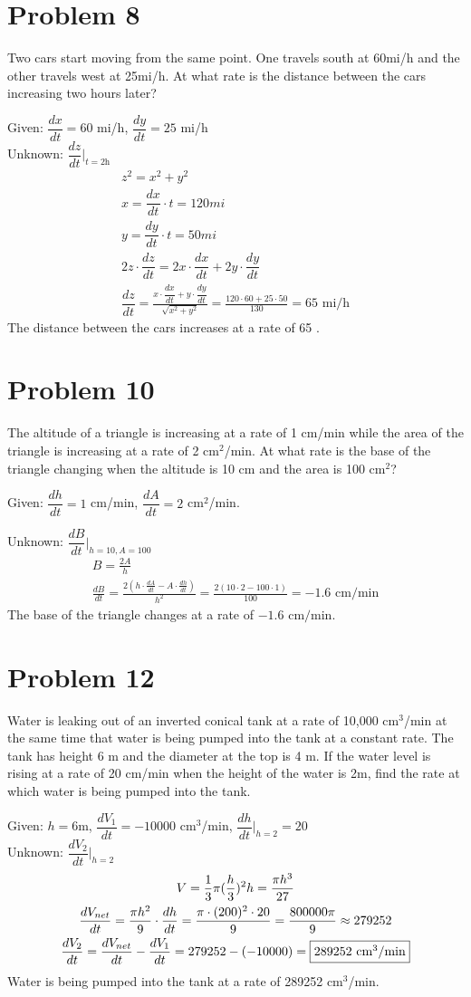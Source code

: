 \documentclass[12pt]{article}
\newcommand{\dydt}{\dfrac{dy}{dt}}
\newcommand{\dxdt}{\dfrac{dx}{dt}}
\newcommand{\vem}{\vspace{0.5em}}
\newcommand{\problem}[1]{\section{Problem #1}}
\begin{document}
\problem{8}
Two cars start moving from the same point. One travels south at 60mi/h and the other travels west at 25mi/h. At what rate is the distance between the cars increasing two hours later? \vem

Given: $\dxdt=60$ mi/h, $\dydt=25$ mi/h\\

Unknown: $\dfrac{dz}{dt} \Big|_{t=2 \text{h}}$
\begin{gather*}
    z^2=x^2+y^2\\
    x=\dxdt\cdot t=120 mi\\
    y=\dydt \cdot t=50mi\\
    2z\cdot \dfrac{dz}{dt}=2x\cdot \dxdt+2y\cdot \dydt\\
    \dfrac{dz}{dt}=\frac{x\cdot \dxdt+y\cdot \dydt}{\sqrt{x^2+y^2}}=\frac{120\cdot 60+25\cdot 50}{130}=\boxed{65 \text{ mi/h}}
\end{gather*}
The distance between the cars increases at a rate of 65 .

\problem{10}
The altitude of a triangle is increasing at a rate of 1 cm/min while the area of the triangle is increasing at a rate of 2 cm$^2$/min. At what rate is the base of the triangle changing when the altitude is 10 cm and the area is 100 cm$^2$?\vem

Given: $\dfrac{dh}{dt}=1$ cm/min, $\dfrac{dA}{dt}=2$ cm$^2$/min. \vem

Unknown: $\dfrac{dB}{dt}\Big|_{h=10, A=100}$
\begin{gather*}
    B=\frac{2A}{h}\\
    \frac{dB}{dt}=\frac{2(h\cdot \frac{dA}{dt}-A\cdot\frac{dh}{dt})}{h^2}=\frac{2(10\cdot 2-100 \cdot 1)}{100}=\boxed{-1.6 \text{ cm/min}}
\end{gather*}
The base of the triangle changes at a rate of $-1.6 \text{ cm/min}$.

\problem{12}
Water is leaking out of an inverted conical tank at a rate of 10,000 cm$^3$/min at the same time that water is being pumped into the tank at a constant rate. The tank has height 6 m and the diameter at the top is 4 m. If the water level is rising at a rate of 20 cm/min when the height of the water is 2m, find the rate at which water is being pumped into the tank. \vem

Given: $h=6$m, $\dfrac{dV_1}{dt}=-10000$ cm$^3$/min, $\dfrac{dh}{dt} \Big|_{h=2}=20$\\

Unknown: $\dfrac{dV_2}{dt}\Big|_{h=2}$
\begin{gather*}
    V=\frac{1}{3}\pi (\frac{h}{3})^2h=\frac{\pi h^3}{27}\\
    \frac{dV_{net}}{dt}=\frac{\pi h^2}{9}\cdot \frac{dh}{dt}=\frac{\pi \cdot (200)^2 \cdot 20}{9}=\frac{800000\pi}{9}\approx 279252\\
    \frac{dV_2}{dt}=\frac{dV_{net}}{dt}-\frac{dV_1}{dt}=279252-(-10000)=\boxed{289252 $ cm$^3$/min$}
\end{gather*}
Water is being pumped into the tank at a rate of 289252 cm$^3$/min.
\end{document}
